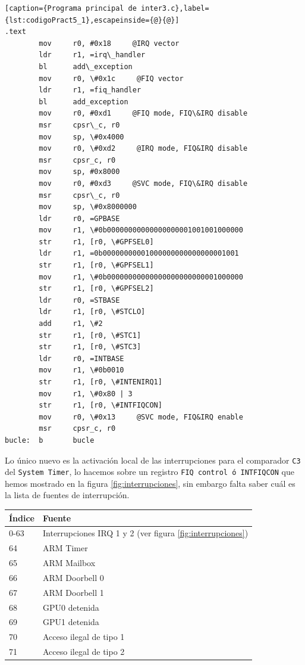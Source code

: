\begin{lstlisting}[caption={Programa principal de inter3.c},label={lst:codigoPract5_1},escapeinside={@}{@}]
.text
        mov     r0, #0x18     @IRQ vector
        ldr     r1, =irq\_handler
        bl      add\_exception
        mov     r0, \#0x1c     @FIQ vector
        ldr     r1, =fiq_handler
        bl      add_exception
        mov     r0, #0xd1     @FIQ mode, FIQ\&IRQ disable
        msr     cpsr\_c, r0
        mov     sp, \#0x4000
        mov     r0, \#0xd2     @IRQ mode, FIQ&IRQ disable
        msr     cpsr_c, r0
        mov     sp, #0x8000
        mov     r0, #0xd3     @SVC mode, FIQ\&IRQ disable
        msr     cpsr\_c, r0
        mov     sp, \#0x8000000
        ldr     r0, =GPBASE
        mov     r1, \#0b00000000000000000001001001000000
        str     r1, [r0, \#GPFSEL0]
        ldr     r1, =0b00000000001000000000000000001001
        str     r1, [r0, \#GPFSEL1]
        mov     r1, \#0b00000000000000000000000001000000
        str     r1, [r0, \#GPFSEL2]
        ldr     r0, =STBASE
        ldr     r1, [r0, \#STCLO]
        add     r1, \#2
        str     r1, [r0, \#STC1]
        str     r1, [r0, \#STC3]
        ldr     r0, =INTBASE
        mov     r1, \#0b0010
        str     r1, [r0, \#INTENIRQ1]
        mov     r1, \#0x80 | 3
        str     r1, [r0, \#INTFIQCON]
        mov     r0, \#0x13     @SVC mode, FIQ&IRQ enable
        msr     cpsr_c, r0
bucle:  b       bucle
\end{lstlisting}

Lo único nuevo es la activación local de las interrupciones para el comparador {\tt C3} del
{\tt System Timer}, lo hacemos sobre un registro {\tt FIQ control ó INTFIQCON} que hemos
mostrado en la figura \ref{fig:interrupciones}, sin embargo falta saber cuál es la lista
de fuentes de interrupción.

\begin{longtable}{ p{2cm} | p{6cm}}
\hline
{\bf Índice} & {\bf Fuente} \\ \hline
0-63  & Interrupciones IRQ 1 y 2 (ver figura \ref{fig:interrupciones})  \\ \hline
64    & ARM Timer  \\ \hline
65    & ARM Mailbox \\ \hline
66    & ARM Doorbell 0 \\ \hline
67    & ARM Doorbell 1 \\ \hline
68    & GPU0 detenida \\ \hline
69    & GPU1 detenida \\ \hline
70    & Acceso ilegal de tipo 1 \\ \hline
71    & Acceso ilegal de tipo 2 \\ \hline
\end{longtable}

